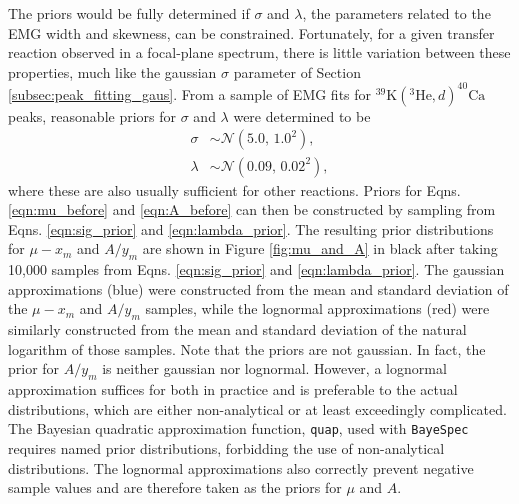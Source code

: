 The priors would be fully determined if $\sigma$ and $\lambda$, the parameters related to the EMG width and skewness, can be constrained. Fortunately, for a given transfer reaction observed in a focal-plane spectrum, there is little variation between these properties, much like the gaussian $\sigma$ parameter of Section \ref{subsec:peak_fitting_gaus}. From a sample of EMG fits for $^{39}\mathrm{K}(^{3}\mathrm{He},d)^{40}\mathrm{Ca}$ peaks, reasonable priors for $\sigma$ and $\lambda$ were determined to be
\begin{align} 
    \sigma &\sim \mathcal{N}(5.0, \, 1.0^{2}), \label{eqn:sig_prior} \\
    \lambda &\sim \mathcal{N}(0.09, \, 0.02^{2}), \label{eqn:lambda_prior}
\end{align} 
where these are also usually sufficient for other reactions. Priors for Eqns. \ref{eqn:mu_before} and \ref{eqn:A_before} can then be constructed by sampling from Eqns. \ref{eqn:sig_prior} and \ref{eqn:lambda_prior}. The resulting prior distributions for $\mu - x_{m}$ and $A / y_{m}$ are shown in Figure \ref{fig:mu_and_A} in black after taking 10,000 samples from Eqns. \ref{eqn:sig_prior} and \ref{eqn:lambda_prior}. The gaussian approximations (blue) were constructed from the mean and standard deviation of the $\mu - x_{m}$ and $A/y_{m}$ samples, while the lognormal approximations (red) were similarly constructed from the mean and standard deviation of the natural logarithm of those samples. Note that the priors are not gaussian. In fact, the prior for $A / y_{m}$ is neither gaussian nor lognormal. However, a lognormal approximation suffices for both in practice and is preferable to the actual distributions, which are either non-analytical or at least exceedingly complicated. The Bayesian quadratic approximation function, \texttt{quap}, used with \texttt{BayeSpec} requires named prior distributions, forbidding the use of non-analytical distributions. The lognormal approximations also correctly prevent negative sample values and are therefore taken as the priors for $\mu$ and $A$.

